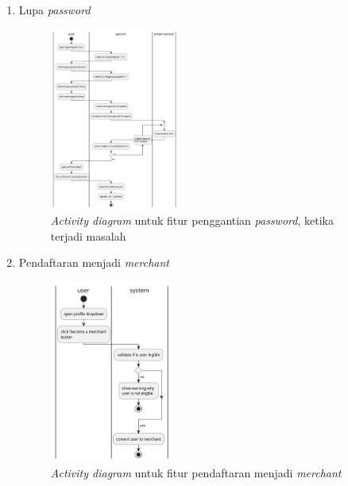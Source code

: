 \documentclass[a4paper]{article}
\begin{document}
\begin{enumerate}
\begin{enumerate}
        \item Lupa \textit{password}
        \begin{figure}[h]
            \centering
            \includegraphics*[height=6cm]{diagram/activity diagram/7. forgot password/forgot password.png}
            \caption{\textit{Activity diagram} untuk fitur penggantian \textit{password}, ketika terjadi masalah}
        \end{figure}
        \item Pendaftaran menjadi \textit{merchant}
        \begin{figure}[h]
            \centering
            \includegraphics*[height=6cm]{diagram/activity diagram/8. become a merchant/become a merchant.png}
            \caption{\textit{Activity diagram} untuk fitur pendaftaran menjadi \textit{merchant}}
        \end{figure}
        \newpage


\end{enumerate}
\end{enumerate}
\end{document}
